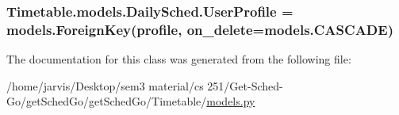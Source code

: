 \subsubsection[{\texorpdfstring{User\+Profile}{UserProfile}}]{\setlength{\rightskip}{0pt plus 5cm}Timetable.\+models.\+Daily\+Sched.\+User\+Profile = models.\+Foreign\+Key({\bf profile}, on\+\_\+delete=models.\+C\+A\+S\+C\+A\+DE)\hspace{0.3cm}{\ttfamily [static]}}\hypertarget{classTimetable_1_1models_1_1DailySched_acad42885d916b028599f5d83e4d3be6a}{}\label{classTimetable_1_1models_1_1DailySched_acad42885d916b028599f5d83e4d3be6a}


The documentation for this class was generated from the following file\+:\begin{DoxyCompactItemize}
\item 
/home/jarvis/\+Desktop/sem3 material/cs 251/\+Get-\/\+Sched-\/\+Go/get\+Sched\+Go/get\+Sched\+Go/\+Timetable/\hyperlink{Timetable_2models_8py}{models.\+py}\end{DoxyCompactItemize}
